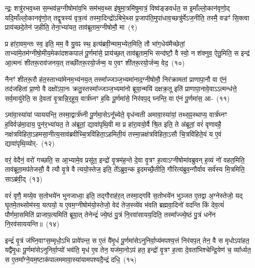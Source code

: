 न्द्रः॒ शत्रु॑रभव॒थ्स स॒म्भव॑न्न॒ग्नी\-षोमा॑व॒भि सम॑भव॒थ्स इ॑षुमा॒त्रमि॑षुमात्रं॒ विष्व॑ङ्ङवर्धत॒ स इ॒माँल्लो॒कान॑वृणो॒द् यदि॒माँल्लो॒का\-नवृ॑णो॒त् तद्वृ॒त्रस्य॑ वृत्र॒त्वं तस्मा॒दिन्द्रो॑\-ऽबिभे॒थ्स प्र॒जा\-प॑ति॒मुपा॑\-धाव॒च्छत्रु॑र्मे\-ऽज॒नीति॒ तस्मै॒ वज्रꣳ॑ सि॒क्त्वा प्राय॑च्छदे॒तेन॑ ज॒हीति॒ तेना॒भ्या॑यत॒ ताव॑ब्रूताम॒ग्नी\-षोमौ॒ मा~(९)

प्र हा॑रा॒वम॒न्तः स्व॒ इति॒ मम॒ वै यु॒वꣴ स्थ॒ इत्य॑ब्रवी॒न्माम॒भ्ये\-त॒मिति॒ तौ भा॑ग॒धेय॑मैच्छेतां॒ ताभ्या॑मे॒त\-म॑ग्नीषो॒मीय॒\-मेका॑\-दश\-कपालं पू॒र्णमा॑से॒ प्राय॑च्छ॒त् ताव॑ब्रूताम॒भि सन्द॑ष्टौ॒ वै स्वो॒ न श॑क्नुव॒ ऐतु॒मिति॒ स इन्द्र॑ आ॒त्मनः॑ शीतरू॒राव॑जनय॒त् तच्छी॑तरू॒रयो॒र्जन्म॒ य ए॒वꣳ शी॑तरू॒रयो॒र्जन्म॒ वेद॒~(१०)


नैनꣳ॑ शीतरू॒रौ ह॑त॒स्ताभ्या॑मेनम॒भ्य॑नय॒त् तस्मा᳚ज्जञ्ज॒भ्यमा॑\-नाद॒ग्नी\-षोमौ॒ निर॑क्रामतां प्राणापा॒नौ वा ए॑नं॒ तद॑जहितां प्रा॒णो वै दक्षो॑\-ऽपा॒नः क्रतु॒स्तस्मा᳚ज्जञ्ज॒भ्यमा॑नो ब्रूया॒न्मयि॑ दक्षक्र॒तू इति॑ प्राणापा॒नावे॒वा\-ऽऽ\-त्मन्ध॑त्ते॒ सर्व॒मायु॑रेति॒ स दे॒वता॑ वृ॒त्रान्नि॒र्॒\mbox{}हूय॒ वार्त्र॑घ्नꣳ ह॒विः पू॒र्णमा॑से॒ निर॑वप॒द् घ्नन्ति॒ वा ए॑नं पू॒र्णमा॑स॒ आ-~(११)

ऽमा॑वा॒स्या॑यां प्याययन्ति॒ तस्मा॒द्वार्त्र॑घ्नी पू॒र्णमा॒से\-ऽनू᳚च्येते॒ वृध॑न्वती अमावा॒स्या॑यां॒ तथ्स॒ꣴ॒स्थाप्य॒ वार्त्र॑घ्नꣳ ह॒विर्वज्र॑मा॒दाय॒ पुन॑र॒भ्या॑यत॒ ते अ॑ब्रूतां॒ द्यावा॑\-पृथि॒वी मा प्र हा॑रा॒वयो॒र्वै श्रि॒त इति॒ ते अ॑ब्रूतां॒ वरं॑ वृणावहै॒ नक्ष॑त्रविहिता॒\-ऽहमसा॒नीत्य॒साव॑ब्रवीच्चि॒त्रवि॑हिता॒\-ऽहमिती॒यं तस्मा॒न्नक्ष॑त्रविहिता॒\-ऽसौ चि॒त्रवि॑हिते॒यं य ए॒वं द्यावा॑पृथि॒व्योर्-~(१२)

वरं॒ वेदैनं॒ वरो॑ गच्छति॒ स आ॒भ्यामे॒व प्रसू॑त॒ इन्द्रो॑ वृ॒त्रम॑ह॒न्ते दे॒वा वृ॒त्रꣳ ह॒त्वा\-ऽग्नी\-षोमा॑वब्रुवन् ह॒व्यं नो॑ वहत॒मिति॒ ताव॑ब्रूता॒मप॑तेजसौ॒ वै त्यौ वृ॒त्रे वै त्ययो॒स्तेज॒ इति॒ ते᳚\-ऽब्रुव॒न्क इ॒दमच्छै॒तीति॒ गौरित्य॑ब्रुव॒न्गौर्वाव सर्व॑स्य मि॒त्रमिति॒ सा\-ऽब्र॑वी॒द्~(१३)

वरं॑ वृणै॒ मय्ये॒व स॒तोभये॑न भुनजाध्वा॒ इति॒ तद्गौराह॑र॒त् तस्मा॒द्गवि॑ स॒तोभये॑न भुञ्जत ए॒तद्वा अ॒ग्नेस्तेजो॒ यद् घृ॒तमे॒तथ्सोम॑स्य॒ यत्पयो॒ य ए॒वम॒ग्नी\-षोम॑यो॒स्तेजो॒ वेद॑ तेज॒स्व्ये॑व भ॑वति ब्रह्मवा॒दिनो॑ वदन्ति किं देव॒त्यं॑ पौर्णमा॒समिति॑ प्राजाप॒त्यमिति॑ ब्रूया॒त् तेनेन्द्रं॑ ज्ये॒ष्ठं पु॒त्रं नि॒रवा॑सायय॒दिति॒ तस्मा᳚ज्ज्ये॒ष्ठं पु॒त्रं धने॑न नि॒रव॑साययन्ति॥~(१४)

{\anuvakamend[{अ॒स्य॒ मा वेदा द्यावा॑पृथि॒व्योर॑ब्रवी॒दिति॒ तस्मा᳚च्च॒त्वारि॑ च}]}%

इन्द्रं॑ वृ॒त्रं ज॑घ्नि॒वाꣳस॒म्मृधो॒\-ऽभि प्रावे॑पन्त॒ स ए॒तं वै॑मृ॒धं पू॒र्णमा॑से\-ऽनुनिर्वा॒प्य॑मपश्य॒त्तं निर॑वप॒त् तेन॒ वै स मृधो\-ऽपा॑हत॒ यद्वै॑मृ॒धः पू॒र्णमा॑से\-ऽनुनिर्वा॒प्यो॑ भव॑ति॒ मृध॑ ए॒व तेन॒ यज॑मा॒नो\-ऽप॑ हत॒ इन्द्रो॑ वृ॒त्रꣳ ह॒त्वा दे॒वता॑भिश्चेन्द्रि॒येण॑ च॒ व्या᳚र्ध्यत॒ स ए॒तमा᳚ग्ने॒यम॒ष्टाक॑पालममावा॒स्या॑यामपश्यदै॒न्द्रं दधि॒~(१५)

